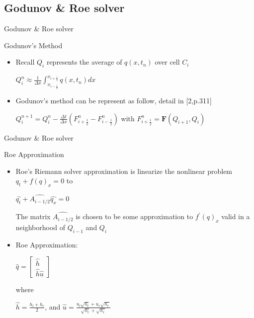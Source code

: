 \documentclass{beamer}
\begin{document}
\subsection{Godunov \& Roe solver} %
\begin{frame}{Godunov \& Roe solver}
\begin{block}{Godunov's Method}
  \begin{itemize}
    \item Recall $Q_{i}$ represents the average of $q(x,t_{n})$ over cell $C_{i}$
     \begin{center}
    $Q_{i}^{n} \approx \frac{1}{\Delta x}\int_{x_{i-\frac{1}{2}}}^{x_{i+\frac{1}{2}}}q(x,t_{n})dx$
    \end{center}
    \item Godunov's method can be represent as follow, detail in [2,p.311]
         \begin{center}
    $Q_{i}^{n+1} = Q_{i}^{n}  - \frac{\Delta t}{\Delta x}(F_{i+\frac{1}{2}}^{n} - F_{i-\frac{1}{2}}^{n})$
    with $F_{i + \frac{1}{2}}^{n} =\boldsymbol{F}(Q_{i+1},Q_{i})$
        \end{center}

  \end{itemize}
\end{block}
\end{frame}
\begin{frame}{Godunov \& Roe solver}

  \begin{block}{Roe Approximation}
	\begin{itemize}
	\item Roe's Riemann solver approximation is linearize the nonlinear problem $q_{t}+f(q)_{x}=0$ to
         \begin{center}
    $\hat{q_{t}}+\hat{A_{i-1/2}}\hat{q_{x}}=0$
        \end{center}
        The matrix $\hat{A_{i-1/2}}$ is chosen to be some approximation to $f^{'}(q)_{x}$ valid in a neighborhood of $Q_{i-1}$ and $Q_{i}$
    \item Roe Approximation:\\
    \begin{center}
    $\hat{q}=\begin{bmatrix}
\hat{h}\\ 
\hat{h}\hat{u}
\end{bmatrix}$
    \end{center}
    where \\\begin{center}$\hat{h}=\frac{h_{l}+h_{r}}{2}$, and $\hat{u}=\frac{u_{l}\sqrt{h_{l}}+u_{r}\sqrt{h_{r}}}{\sqrt{h_{l}} + \sqrt{h_{r}}}$ \end{center}

  \end{itemize}

  \end{block}

\end{frame}
\end{document}

